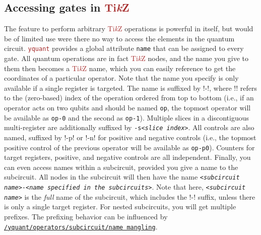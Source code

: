 \documentclass{scrartcl}
\def\TikZ{\textcolor{brown}{Ti\textit kZ}}
\def\pkg#1{\textcolor{brown}{\texttt{#1}}}
\def\style#1{\hyperref[style:#1]{\texttt{#1}}}
\def\Yquant{\pkg{yquant}}
\begin{document}
      \subsection{Accessing gates in \texorpdfstring{\TikZ}{TikZ}}
         The feature to perform arbitrary \TikZ{} operations is powerful in itself, but would be of limited use were there no way to access the elements in the quantum circuit.
         \Yquant{} provides a global attribute \texttt{name} that can be assigned to every gate.
         All quantum operations are in fact \TikZ{} nodes, and the name you give to them then becomes a \TikZ{} name, which you can easily reference to get the coordinates of a particular operator.
         Note that the name you specify is only available if a single register is targeted.
         The name is suffixed by \tex!-\idx!, where \tex!\idx! refers to the (zero\hyp based) index of the operation ordered from top to bottom (i.e., if an operator acts on two qubits and should be named \texttt{op}, the topmost operator will be available as \texttt{op-0} and the second as \texttt{op-1}).
         Multiple slices in a discontiguous multi\hyp register are additionally suffixed by \texttt{-s\textit{<slice index>}}.
         All controls are also named, suffixed by \tex!-p\idx! or \tex!-n\idx! for positive and negative controls (i.e., the topmost positive control of the previous operator will be available as \texttt{op-p0}).
         Counters for target registers, positive, and negative controls are all independent.
         Finally, you can even access names within a subcircuit, provided you give a name to the subcircuit.
         All nodes in the subcircuit will then have the name \texttt{\textit{<subcircuit name>}-\textit{<name specified in the subcircuits>}}.
         Note that here, \texttt{\textit{<subcircuit name>}} is the \emph{full} name of the subcircuit, which includes the \tex!-\idx! suffix, unless there is only a single target register.
         For nested subcircuits, you will get multiple prefixes.
         The prefixing behavior can be influenced by \style{/yquant/operators/subcircuit/name mangling}.
\end{document}
